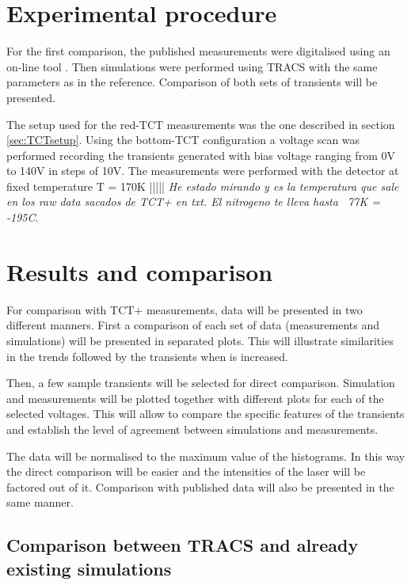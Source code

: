 \section{Experimental procedure} %
\label{sec:ExpProc}

For the  first comparison, the published measurements were digitalised using an on-line tool \cite{digitiser}. Then simulations were performed using TRACS with the same parameters as in the reference. Comparison of both sets of transients will be presented.

The setup used for the red-TCT measurements was the one described in section \ref{sec:TCTsetup}. Using the bottom-TCT configuration a voltage scan was performed recording the transients generated with bias voltage ranging from 0V to 140V in steps of 10V. The measurements were performed with the detector at fixed temperature T = 170K ||||| \emph{He estado mirando y es la temperatura que sale en los raw data sacados de TCT+ en txt. El nitrogeno te lleva hasta ~77K = -195C}. 

\section{Results and comparison} %
\label{sec:comparison}

For comparison with TCT+ measurements, data will be presented in two different manners. First a comparison of each set of data (measurements and simulations) will be presented in separated plots. This will illustrate similarities in the trends followed by the transients when \vias is increased. 

Then, a few sample transients will be selected for direct comparison. Simulation and measurements will be plotted together with different plots for each of the selected voltages. This will allow to compare the specific features of the transients and establish the level of agreement between simulations and measurements. 

The data will be normalised to the maximum value of the histograms. In this way the direct comparison will be easier and the intensities of the laser will be factored out of it. Comparison with published data will also be presented in the same manner.

\subsection{Comparison between TRACS and already existing simulations}

